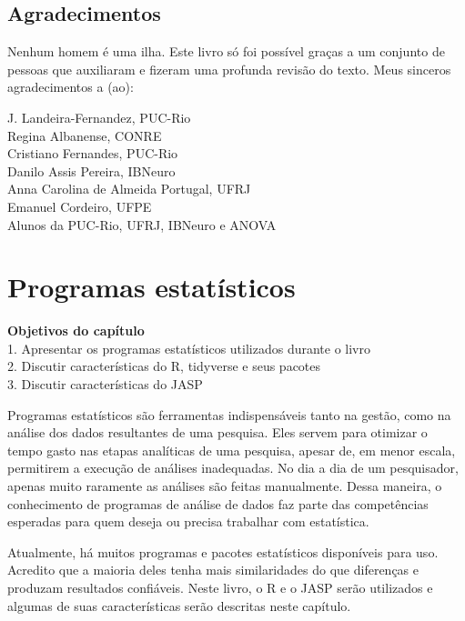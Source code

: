 \documentclass[
]{book}
\newenvironment{objectives}{
  \definecolor{shadecolor}{rgb}{0.764,0.992,0.686}  %
  \color{black}
  \begin{shaded}}
 {\end{shaded}}
\begin{document}
\hypertarget{agradecimentos}{%
\section{Agradecimentos}\label{agradecimentos}}

Nenhum homem é uma ilha. Este livro só foi possível graças a um conjunto de pessoas que auxiliaram e fizeram uma profunda revisão do texto. Meus sinceros agradecimentos a (ao):

J. Landeira-Fernandez, PUC-Rio\\
Regina Albanense, CONRE\\
Cristiano Fernandes, PUC-Rio\\
Danilo Assis Pereira, IBNeuro\\
Anna Carolina de Almeida Portugal, UFRJ\\
Emanuel Cordeiro, UFPE\\
Alunos da PUC-Rio, UFRJ, IBNeuro e ANOVA

\hypertarget{programas-estatuxedsticos}{%
\chapter{Programas estatísticos}\label{programas-estatuxedsticos}}

\begin{objectives}
\textbf{Objetivos do capítulo}\\
1. Apresentar os programas estatísticos utilizados durante o livro\\
2. Discutir características do R, tidyverse e seus pacotes\\
3. Discutir características do JASP

\end{objectives}

Programas estatísticos são ferramentas indispensáveis tanto na gestão, como na análise dos dados resultantes de uma pesquisa. Eles servem para otimizar o tempo gasto nas etapas analíticas de uma pesquisa, apesar de, em menor escala, permitirem a execução de análises inadequadas. No dia a dia de um pesquisador, apenas muito raramente as análises são feitas manualmente. Dessa maneira, o conhecimento de programas de análise de dados faz parte das competências esperadas para quem deseja ou precisa trabalhar com estatística.

Atualmente, há muitos programas e pacotes estatísticos disponíveis para uso. Acredito que a maioria deles tenha mais similaridades do que diferenças e produzam resultados confiáveis. Neste livro, o R e o JASP serão utilizados e algumas de suas características serão descritas neste capítulo.
\end{document}

